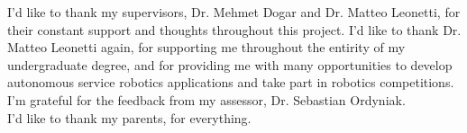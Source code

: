 I'd like to thank my supervisors, Dr. Mehmet Dogar and Dr. Matteo Leonetti, for their constant support and thoughts throughout this project. I'd like to thank Dr. Matteo Leonetti again, for supporting me throughout the entirity of my undergraduate degree, and for providing me with many opportunities to develop autonomous service robotics applications and take part in robotics competitions.
\\I'm grateful for the feedback from my assessor, Dr. Sebastian Ordyniak.
\\I'd like to thank my parents, for everything.
